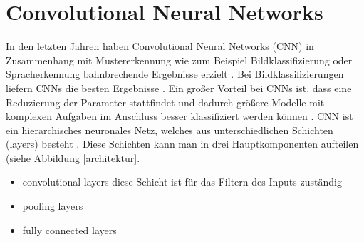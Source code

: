 \chapter{Convolutional Neural Networks}
In den letzten Jahren haben Convolutional Neural Networks (CNN) in Zusammenhang mit Mustererkennung wie zum Beispiel Bildklassifizierung oder Spracherkennung bahnbrechende Ergebnisse erzielt \cite{bilderkennung}. Bei Bildklassifizierungen liefern CNNs die besten Ergebnisse \cite{imagenet}. Ein großer Vorteil bei CNNs ist, dass eine Reduzierung der Parameter stattfindet und dadurch größere Modelle mit komplexen Aufgaben im Anschluss besser klassifiziert werden können \cite{bilderkennung}. CNN ist ein hierarchisches neuronales Netz, welches aus unterschiedlichen Schichten (layers) besteht \cite{badshah2019deep}. Diese Schichten kann man in drei Hauptkomponenten aufteilen (siehe Abbildung \ref{architektur}.
\begin{itemize}
	\item  convolutional layers \newline diese Schicht ist für das Filtern des Inputs zuständig \cite{badshah2019deep}
	\item  pooling layers 
	\item  fully connected layers
	
\end{itemize}

